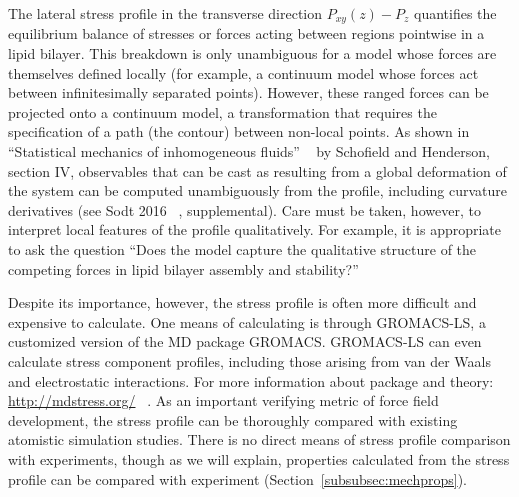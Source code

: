 \documentclass[9pt,bestpractices,pubversion]{livecoms}
\begin{document}
The lateral stress profile in the transverse direction $P_{xy}(z)-P_z$ quantifies the equilibrium balance of stresses or forces acting between regions pointwise in a lipid bilayer.
This breakdown is only unambiguous for a model whose forces are themselves defined locally (for example, a continuum model whose forces act between infinitesimally separated points).
However, these ranged forces can be projected onto a continuum model, a transformation that requires the specification of a path (the contour) between non-local points.
As shown in ``Statistical mechanics of inhomogeneous fluids'' ~\cite{Society2014} by Schofield and Henderson, section IV, observables that can be cast as resulting from a global deformation of the system can be computed unambiguously from the profile, including curvature derivatives (see Sodt 2016 ~\cite{Sodt2016}, supplemental).
Care must be taken, however, to interpret local features of the profile qualitatively.
For example, it is appropriate to ask the question ``Does the model capture the qualitative structure of the competing forces in lipid bilayer assembly and stability?''

Despite its importance, however, the stress profile is often more difficult and expensive to calculate.
One means of calculating is through GROMACS-LS, a customized version of the MD package GROMACS.
GROMACS-LS can even calculate stress component profiles, including those arising from van der Waals and electrostatic interactions.
For more information about package and theory: \url{http://mdstress.org/} ~\cite{Torres-Sanchez2016,Torres-Sanchez2015,Vanegas2014a,Ollila2009}.
As an important verifying metric of force field development, the stress profile can be thoroughly compared with existing atomistic simulation studies.
There is no direct means of stress profile comparison with experiments, though as we will explain, properties calculated from the stress profile can be compared with experiment (Section~\ref{subsubsec:mechprops}).
\end{document}

